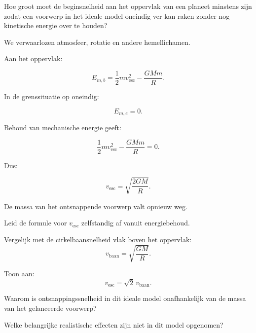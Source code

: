 \documentclass{ximera}
\begin{document}

Hoe groot moet de beginsnelheid aan het oppervlak van een planeet minstens
zijn zodat een voorwerp in het ideale model oneindig ver kan raken zonder nog
kinetische energie over te houden?

We verwaarlozen atmosfeer, rotatie en andere hemellichamen.

Aan het oppervlak:

\[
E_{m,b}
=
\frac12mv_{\mathrm{esc}}^2-\frac{GMm}{R}.
\]

In de grenssituatie op oneindig:

\[
E_{m,e}=0.
\]

Behoud van mechanische energie geeft:

\[
\frac12mv_{\mathrm{esc}}^2-\frac{GMm}{R}=0.
\]

Dus:

\[
\boxed{
v_{\mathrm{esc}}
=
\sqrt{\frac{2GM}{R}}.
}
\]

De massa van het ontsnappende voorwerp valt opnieuw weg.

\begin{oefening}[Ontsnappingssnelheid]{\oefG}

\begin{question}
Leid de formule voor $v_{\mathrm{esc}}$ zelfstandig af vanuit energiebehoud.
\end{question}

\begin{question}
Vergelijk met de cirkelbaansnelheid vlak boven het oppervlak:
\[
v_{\mathrm{baan}}=\sqrt{\frac{GM}{R}}.
\]
\end{question}

\begin{question}
Toon aan:
\[
v_{\mathrm{esc}}=\sqrt2\,v_{\mathrm{baan}}.
\]
\end{question}

\begin{question}
Waarom is ontsnappingssnelheid in dit ideale model onafhankelijk van de massa
van het gelanceerde voorwerp?
\end{question}

\begin{question}
Welke belangrijke realistische effecten zijn niet in dit model opgenomen?
\end{question}

\end{oefening}
\end{document}

